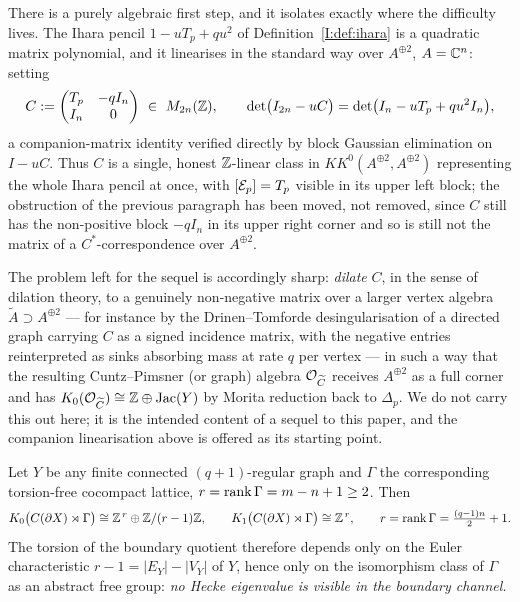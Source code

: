 \begin{remark}
There is a purely algebraic first step, and it isolates exactly where the difficulty
lives. The Ihara pencil $1-uT_p+qu^2$ of Definition~\ref{I:def:ihara} is a quadratic
matrix polynomial, and it linearises in the standard way over $A^{\oplus2}$,
$A=\mathbb{C}^n$: setting
\[
C:=\begin{pmatrix}T_p&-qI_n\\ I_n&0\end{pmatrix}\ \in\ M_{2n}(\mathbb{Z}),
\qquad
\det\bigl(I_{2n}-uC\bigr)=\det\bigl(I_n-uT_p+qu^2I_n\bigr),
\]
a companion-matrix identity verified directly by block Gaussian elimination on
$I-uC$. Thus $C$ is a single, honest $\mathbb{Z}$-linear class in $KK^0(A^{\oplus2},A^{\oplus2})$
representing the whole Ihara pencil at once, with $[\mathcal{E}_p]=T_p$ visible in its upper
left block; the obstruction of the previous paragraph has been moved, not removed, since
$C$ still has the non-positive block $-qI_n$ in its upper right corner and so is still
not the matrix of a $C^*$-correspondence over $A^{\oplus2}$.

The problem left for the sequel is accordingly sharp: \emph{dilate} $C$, in the sense of
dilation theory, to a genuinely non-negative matrix over a larger vertex algebra
$\widetilde A\supset A^{\oplus2}$ --- for instance by the Drinen--Tomforde
desingularisation of a directed graph carrying $C$ as a signed incidence matrix, with the
negative entries reinterpreted as sinks absorbing mass at rate $q$ per vertex --- in such
a way that the resulting Cuntz--Pimsner (or graph) algebra $\mathcal{O}_{\widetilde C}$ receives
$A^{\oplus2}$ as a full corner and has $K_0(\mathcal{O}_{\widetilde C})\cong\mathbb{Z}\oplus\operatorname{Jac}(Y)$ by
Morita reduction back to $\Delta_p$. We do not carry this out here; it is the intended
content of a sequel to this paper, and the companion linearisation above is offered as
its starting point.
\end{remark}

\begin{theorem}\label{I:thm:blind}
Let $Y$ be any finite connected $(q+1)$-regular graph and $\Gamma$ the corresponding
torsion-free cocompact lattice, $r=\operatorname{rank}\Gamma=m-n+1\ge2$. Then
\[
K_0\bigl(C(\partial X)\rtimes\Gamma\bigr)\cong\mathbb{Z}^{\,r}\oplus\mathbb{Z}/(r-1)\mathbb{Z},
\qquad
K_1\bigl(C(\partial X)\rtimes\Gamma\bigr)\cong\mathbb{Z}^{\,r},
\qquad r=\operatorname{rank}\Gamma=\tfrac{(q-1)n}{2}+1 .
\]
The torsion of the boundary quotient therefore depends only on the Euler characteristic
$r-1=|E_Y|-|V_Y|$ of $Y$, hence only on the isomorphism class of $\Gamma$ as an abstract
free group: \emph{no Hecke eigenvalue is visible in the boundary channel.}
\end{theorem}

